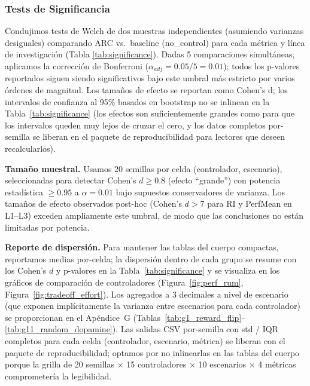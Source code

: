 \documentclass{article}
\begin{document}
\subsubsection{Tests de Significancia}
Condujimos tests de Welch de dos muestras independientes (asumiendo varianzas desiguales) comparando ARC vs.\ baseline (no\_control) para cada métrica y línea de investigación (Tabla \ref{tab:significance}). Dadas 5 comparaciones simultáneas, aplicamos la corrección de Bonferroni ($\alpha_{adj} = 0.05/5 = 0.01$); todos los p-valores reportados siguen siendo significativos bajo este umbral más estricto por varios órdenes de magnitud. Los tamaños de efecto se reportan como Cohen's d; los intervalos de confianza al 95\% basados en bootstrap no se inlinean en la Tabla~\ref{tab:significance} (los efectos son suficientemente grandes como para que los intervalos queden muy lejos de cruzar el cero, y los datos completos por-semilla se liberan en el paquete de reproducibilidad para lectores que deseen recalcularlos).

\textbf{Tamaño muestral.} Usamos 20 semillas por celda (controlador, escenario), seleccionadas para detectar Cohen's $d \geq 0.8$ (efecto ``grande'') con potencia estadística $\geq 0.95$ a $\alpha = 0.01$ bajo supuestos conservadores de varianza. Los tamaños de efecto observados post-hoc (Cohen's $d > 7$ para RI y PerfMean en L1--L3) exceden ampliamente este umbral, de modo que las conclusiones no están limitadas por potencia.

\textbf{Reporte de dispersión.} Para mantener las tablas del cuerpo compactas, reportamos medias por-celda; la dispersión dentro de cada grupo se resume con los Cohen's $d$ y p-valores en la Tabla~\ref{tab:significance} y se visualiza en los gráficos de comparación de controladores (Figura~\ref{fig:perf_rum}, Figura~\ref{fig:tradeoff_effort}). Los agregados a 3 decimales a nivel de escenario (que exponen implícitamente la varianza entre escenarios para cada controlador) se proporcionan en el Apéndice~G (Tablas~\ref{tab:g1_reward_flip}--\ref{tab:g11_random_dopamine}). Las salidas CSV por-semilla con std / IQR completos para cada celda (controlador, escenario, métrica) se liberan con el paquete de reproducibilidad; optamos por no inlinearlas en las tablas del cuerpo porque la grilla de 20 semillas $\times$ 15 controladores $\times$ 10 escenarios $\times$ 4 métricas comprometería la legibilidad.
\end{document}
